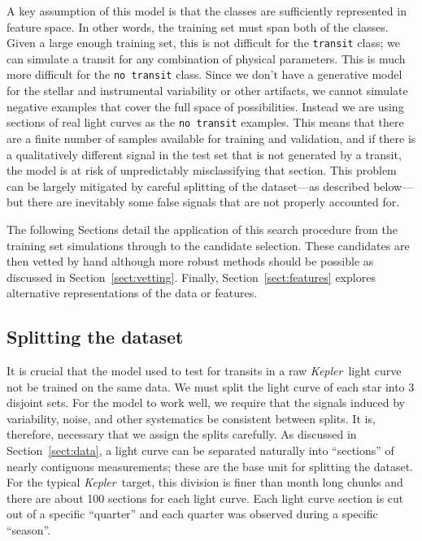 \documentclass[12pt,preprint]{aastex}
\newcommand{\project}[1]{\textsl{#1}}
\newcommand{\kepler}{\project{Kepler}}
\newcommand{\sectionname}{Section}
\newcommand{\sectref}[1]{\ref{sect:#1}}
\newcommand{\Sect}[1]{\sectionname~\sectref{#1}}
\newcommand{\sect}[1]{\Sect{#1}}
\newcommand{\sectlabel}[1]{\label{sect:#1}}
\begin{document}
A key assumption of this model is that the classes are sufficiently
represented in feature space.
In other words, the training set must span both of the classes.
Given a large enough training set, this is not difficult for the
\texttt{transit} class; we can simulate a transit for any combination of
physical parameters.
This is much more difficult for the \texttt{no transit} class.
Since we don't have a generative model for the stellar and instrumental
variability or other artifacts, we cannot simulate negative examples that
cover the full space of possibilities.
Instead we are using sections of real light curves as the \texttt{no transit}
examples.
This means that there are a finite number of samples available for training
and validation, and if there is a qualitatively different signal in the test
set that is not generated by a transit, the model is at risk of unpredictably
misclassifying that section.
This problem can be largely mitigated by careful splitting of the dataset---as
described below---but there are inevitably some false signals that are not
properly accounted for.

The following \sectionname s detail the application of this search procedure
from the training set simulations through to the candidate selection.
These candidates are then vetted by hand although more robust methods should
be possible as discussed in \sect{vetting}.
Finally, \sect{features} explores alternative representations of the data or
features.


\subsection{Splitting the dataset}\sectlabel{split}

It is crucial that the model used to test for transits in a raw \kepler\
light curve not be trained on the same data.
We must split the light curve of each star into 3 disjoint sets.
For the model to work well, we require that the signals induced by
variability, noise, and other systematics be consistent between splits.
It is, therefore, necessary that we assign the splits carefully.
As discussed in \sect{data}, a light curve can be separated naturally into
``sections'' of nearly contiguous measurements; these are the base unit for
splitting the dataset.
For the typical \kepler\ target, this division is finer than month long
chunks and there are about 100 sections for each light curve.
Each light curve section is cut out of a specific ``quarter'' and each quarter
was observed during a specific ``season''.
\end{document}

